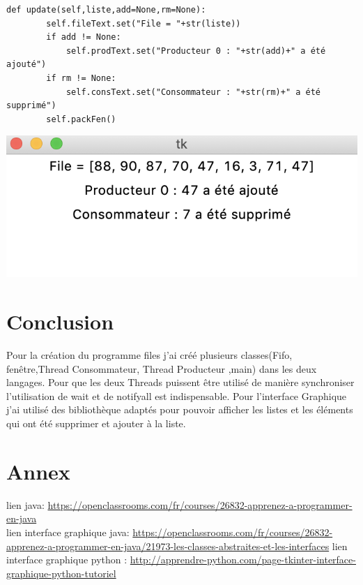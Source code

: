 \documentclass[13pt]{article}
\begin{document}
\vspace{5mm}
\begin{verbatim}
def update(self,liste,add=None,rm=None):
        self.fileText.set("File = "+str(liste))
        if add != None:
            self.prodText.set("Producteur 0 : "+str(add)+" a été ajouté")
        if rm != None:
            self.consText.set("Consommateur : "+str(rm)+" a été supprimé")
        self.packFen()
\end{verbatim}
\includegraphics[scale=1.2]{image4.png}
\section{Conclusion}
Pour la création du programme files j'ai créé plusieurs classes(Fifo, fenêtre,Thread Consommateur, Thread Producteur ,main) dans les deux langages. Pour que les deux Threads puissent être utilisé de manière synchroniser l'utilisation de wait et de notifyall est indispensable. Pour l'interface Graphique j'ai utilisé des bibliothèque adaptés pour pouvoir afficher les listes et les éléments qui ont été supprimer et ajouter à la liste.
\section{Annex}
lien java:
\url{https://openclassrooms.com/fr/courses/26832-apprenez-a-programmer-en-java}\\
lien interface graphique java:
\url{https://openclassrooms.com/fr/courses/26832-apprenez-a-programmer-en-java/21973-les-classes-abstraites-et-les-interfaces}
lien interface graphique python :
\url{http://apprendre-python.com/page-tkinter-interface-graphique-python-tutoriel}
\end{document}
